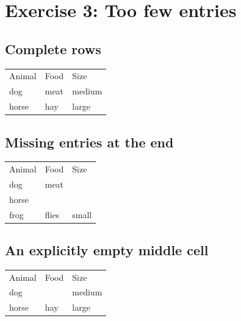 \documentclass{article}
\begin{document}
\section*{Exercise 3: Too few entries}

\subsection*{Complete rows}

\begin{tabular}{lll}
Animal & Food & Size \\
dog & meat & medium \\
horse & hay & large \\
\end{tabular}

\subsection*{Missing entries at the end}

\begin{tabular}{lll}
Animal & Food & Size \\
dog & meat \\
horse \\
frog & flies & small \\
\end{tabular}

\subsection*{An explicitly empty middle cell}

\begin{tabular}{lll}
Animal & Food & Size \\
dog & & medium \\
horse & hay & large \\
\end{tabular}
\end{document}
